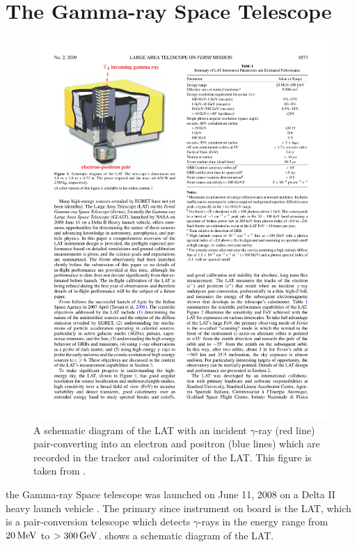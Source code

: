 \section{The \fermi Gamma-ray Space Telescope}

\begin{figure}[htbp]
  \centering
    \includegraphics{chapters/introduction/figures/lat_detector_cutout.pdf}
  \caption{A schematic diagram of the \ac{LAT} with an incident $\gamma$-ray
    (red line) pair-converting into an electron and positron (blue lines)
    which are recorded in the tracker and calorimiter of the \ac{LAT}.
    This figure is taken from \citep{atwood_2009a_large-telescope}.  
  }
\end{figure} 


the \fermi Gamma-ray Space telescope was launched on June 11, 2008 on
a Delta II heavy launch vehicle \citep{atwood_2009a_large-telescope}.
The primary since instrument on board \fermi is the \ac{LAT},
which is a pair-conversion telescope which detects $\gamma$-rays in
the energy range from $20\,\text{MeV}$ to $>300\,\text{GeV}$.
 shows a schematic diagram of the \ac{LAT}.

